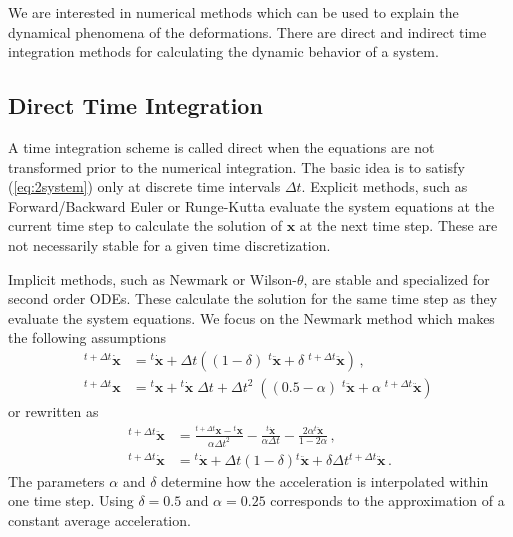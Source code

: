 \documentclass[conference]{journal}
\newcommand{\B}[1]{\mathbf{#1}}
\newcommand{\Bx}{\B{x}}
\newcommand{\xt}{{}^{t}\Bx}
\newcommand{\vt}{{}^{t}\dot{\Bx}}
\newcommand{\at}{{}^{t}\ddot{\Bx}}
\newcommand{\xtt}{{}^{t+\Delta t}\Bx}
\newcommand{\vtt}{{}^{t+\Delta t}\dot{\Bx}}
\newcommand{\att}{{}^{t+\Delta t}\ddot{\Bx}}
\begin{document}
	We are interested in numerical methods which can be used to explain the dynamical phenomena of the deformations. There are direct and indirect time integration methods for calculating the dynamic behavior of a system.


	\subsection{Direct Time Integration}
	A time integration scheme is called direct when the equations are not transformed prior to the numerical integration. The basic idea is to satisfy (\ref{eq:2system}) only at discrete time intervals $\Delta t$. Explicit methods, such as Forward/Backward Euler or Runge-Kutta evaluate the system equations at the current time step to calculate the solution of $\Bx$ at the next time step. These are not necessarily stable for a given time discretization.

	Implicit methods, such as Newmark or Wilson-$\theta$, are stable and specialized for second order ODEs. These calculate the solution for the same time step as they evaluate the system equations. We focus on the Newmark method which makes the following assumptions
	\begin{equation} \label{eq:2newmark-asump}
	\begin{aligned}
	\vtt &= \vt 
	+ \Delta t \left((1-\delta)\; \at + \delta\;\att \right)\,,
	\\[.5em]
	\xtt &= \xt + \vt\;\Delta t
	+ \Delta t^2\;\left((0.5-\alpha) \; \at + \alpha\;\att \right)\,
	\end{aligned}
	\end{equation}
	or rewritten as
	\begin{equation} \label{eq:2newmark-asump-re}
	\begin{aligned}
	\att &= \frac{\xtt - \xt}{\alpha \Delta t^2} - \frac{\vt}{\alpha \Delta t} - \frac{2 \alpha \at}{1 - 2\alpha}\,,
	\\[.5em]
	\vtt &= \vt + \Delta t (1-\delta) \at + \delta \Delta t \att\,.
	\end{aligned}
	\end{equation}
	The parameters $\alpha$ and $\delta$ determine how the acceleration is interpolated within one time step. Using $\delta=0.5$ and $\alpha=0.25$ corresponds to the approximation of a constant average acceleration.
	
\end{document}
